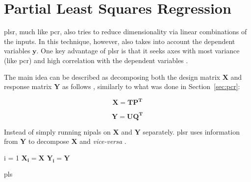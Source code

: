 \newpage
\section{Partial Least Squares Regression}
\label{sec:plsr}

\acrshort{plsr}, much like \acrshort{pcr}, also tries to reduce dimensionality via linear combinations of the inputs. In this technique, however, also takes into account the dependent variables $\mathbf{y}$. One key advantage of \acrshort{plsr} is that it seeks axes with most variance (like \acrshort{pcr}) and high correlation with the dependent variables \cite{friedman2001}.

The main idea can be described as decomposing both the design matrix $\mathbf{X}$ and response matrix $\mathbf{Y}$ as follows \cite{ng2013}, similarly to what was done in Section~\ref{sec:pcr}:

\begin{equation}
	\label{eqn:x-decomp}
	\mathbf{X=TP^T}
\end{equation}

\begin{equation}
	\label{eqn:y-decomp}
	\mathbf{Y = UQ^T}
\end{equation}

Instead of simply running \acrshort{nipals} on $\mathbf{X}$ and $\mathbf{Y}$ separately. \acrshort{plsr} uses information from $\mathbf{Y}$ to decompose $\mathbf{X}$ and \textit{vice-versa} \cite{ng2013}.

\begin{algorithm}[H]
	\label{algo:pls}
	\SetAlgoLined
	i = 1\;
	$\mathbf{X_i = X}$\;
	$\mathbf{Y_i = Y}$\;
	
\caption{\acrfull{pls}}
\end{algorithm}

